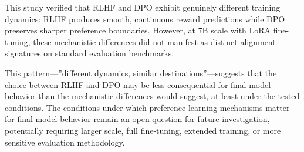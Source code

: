 
This study verified that RLHF and DPO exhibit genuinely different training dynamics: RLHF produces smooth, continuous reward predictions while DPO preserves sharper preference boundaries. However, at 7B scale with LoRA fine-tuning, these mechanistic differences did not manifest as distinct alignment signatures on standard evaluation benchmarks.

This pattern---''different dynamics, similar destinations''---suggests that the choice between RLHF and DPO may be less consequential for final model behavior than the mechanistic differences would suggest, at least under the tested conditions. The conditions under which preference learning mechanisms matter for final model behavior remain an open question for future investigation, potentially requiring larger scale, full fine-tuning, extended training, or more sensitive evaluation methodology.

